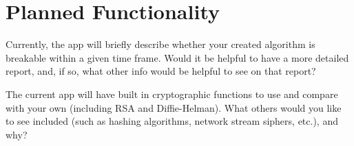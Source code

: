 \section{Planned Functionality}

\dd

\begin{question}
Currently, the app will briefly describe whether your created
algorithm is breakable within a given time frame. Would it be
helpful to have a more detailed report, and, if so, what other
info would be helpful to see on that report?
\end{question}

\begin{question}
The current app will have built in cryptographic functions to use and 
compare with your own (including RSA and Diffie-Helman). What others
would you like to see included (such as hashing algorithms, network stream siphers, etc.),
and why?
\end{question}
